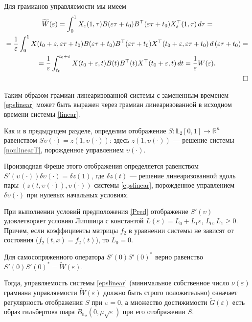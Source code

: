 \documentclass[../main.tex]{subfiles}
\begin{document}
Для грамианов управляемости мы имеем
\begin{gather*}
	\begin{gathered}
		\widetilde{W}(\varepsilon) =
		\int_0^1
		X_{ \varepsilon} (1,\tau)
		B(\varepsilon \tau + t_0)
		B^{\top}(\varepsilon \tau + t_0)
		X_{ \varepsilon}^{\top} (1,\tau) \, d\tau = \\
		= \dfrac{1}{\varepsilon}\int_0^1
		X(t_0+\varepsilon,\varepsilon \tau + t_0)
		B(\varepsilon \tau + t_0)
		B^{\top}(\varepsilon \tau + t_0)
		X^{\top}(t_0+\varepsilon,\varepsilon \tau + t_0) \,
		d\left( \varepsilon\tau + t_0\right) = \\ =
		\dfrac{1}{\varepsilon} \int_{t_0}^{t_0+\varepsilon}
		X(t_0+\varepsilon,t)
		B(t)
		B^{\top}(t)
		X^{\top}(t_0+\varepsilon,t) \, dt = \dfrac{1}{\varepsilon} W(\varepsilon). \\ \hfill \square
	\end{gathered}
\end{gather*}


Таким образом грамиан линеаризованной системы с замененным временем \eqref{epslinear} может быть выражен через грамиан линеаризованной в исходном времени системы \eqref{linear}.
    
    
 Как и в предыдущем разделе, определим отображение $S: \mathbb{L}_2[0,1] \rightarrow \mathbb{R}^n $ равенством $S\upsilon(\cdot) = z(1,\upsilon(\cdot))$: здесь $ z(1,\upsilon(\cdot))$ --- решение системы \eqref{nonlinearT}, порожденное управлением $\upsilon(\cdot)$. 
 
 Производная Фреше этого отображения определяется равенством $ S'(\upsilon(\cdot))\delta \upsilon(\cdot) = \delta z(1)$, где $\delta z(t)$ --- решение линеаризованной вдоль пары $\left( z(t,\upsilon(\cdot)),\upsilon(\cdot)\right)  $ системы \eqref{epslinear}, порожденное управлением $\delta \upsilon(\cdot)$ при нулевых начальных условиях.
 
 
 При выполнении условий предположения \ref{Pred} отображение $S'(\upsilon)$ удовлетворяет условию Липшица с константой $L(\varepsilon) = L_0 + L_1\varepsilon$, $ L_0, L_1 \geqslant 0 $. Причем, если коэффициенты матрицы $f_2$ в уравнении системы не зависят от состояния ($f_2(t,x) = f_2(t)$), то $L_0 = 0$. 
  
  Для самосопряженного оператора $S'(0)S'(0)^*$ верно равенство $S'(0)S'(0)^* = \widetilde{W}(\varepsilon)$.
  
   Тогда, управляемость системы \eqref{epslinear} (минимальное собственное число $ \nu(\varepsilon) $ грамиана управляемости $\widetilde{W}(\varepsilon)$ должно быть строго положительно) означает регулярность отображения $S$ при $\upsilon = 0$, а множество достижимости $\widetilde{G}(\varepsilon)$ есть образ гильбертова шара $B_{\mathbb{L}_2}(0,\mu\sqrt{\varepsilon})$ при его отображении $S$.
   
\end{document}
